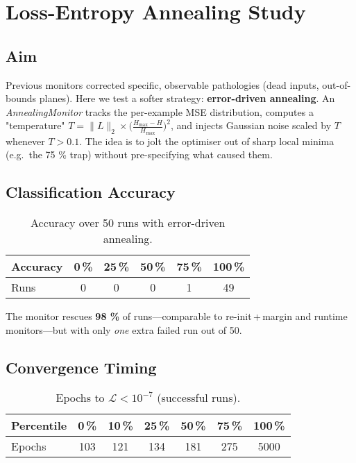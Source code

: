 \section{Loss-Entropy Annealing Study}
\label{sec:relu1-annealing}

\subsection*{Aim}
Previous monitors corrected specific, observable pathologies (dead inputs,
out-of-bounds planes).  
Here we test a softer strategy: \textbf{error-driven annealing}.
An \emph{AnnealingMonitor} tracks the per-example MSE distribution,
computes a "temperature"
\(T = \lVert\!L\!\rVert_2 \times \bigl(\!\tfrac{H_{\max}-H}{H_{\max}}\bigr)^2\),
and injects Gaussian noise scaled by \(T\) whenever
\(T > 0.1\).
The idea is to jolt the optimiser out of sharp local minima
(e.g.\ the 75 \% trap) without pre-specifying what caused them.

\subsection*{Classification Accuracy}

\begin{table}[h]
\centering
\caption{Accuracy over 50 runs with error-driven annealing.}
\label{tab:relu1-anneal-accuracy}
\begin{tabular}{lccccc}
\toprule
Accuracy & 0\,\% & 25\,\% & 50\,\% & 75\,\% & 100\,\% \\
\midrule
Runs & 0 & 0 & 0 & 1 & 49 \\
\bottomrule
\end{tabular}
\end{table}

The monitor rescues \textbf{98 \%} of runs—comparable to
re-init\,+\,margin and runtime monitors—but with only \emph{one} extra
failed run out of 50.

\subsection*{Convergence Timing}

\begin{table}[h]
\centering
\caption{Epochs to $\mathcal L<10^{-7}$ (successful runs).}
\label{tab:relu1-anneal-epochs}
\begin{tabular}{lcccccc}
\toprule
Percentile & 0\,\% & 10\,\% & 25\,\% & 50\,\% & 75\,\% & 100\,\% \\ \midrule
Epochs & 103 & 121 & 134 & 181 & 275 & 5000 \\
\bottomrule
\end{tabular}
\end{table}

